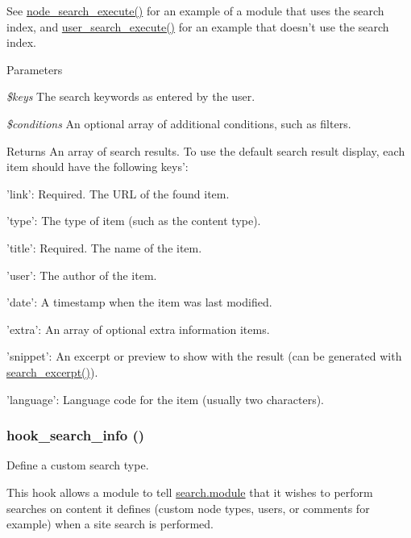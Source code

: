 See \hyperlink{node_8module_ad7047dcdd1c1934351adb73de080c640}{node\_\-search\_\-execute()} for an example of a module that uses the search index, and \hyperlink{user_8module_a04e2120f38c081b16387b631602cc47f}{user\_\-search\_\-execute()} for an example that doesn't use the search index.


\begin{DoxyParams}{Parameters}
\item[{\em \$keys}]The search keywords as entered by the user. \item[{\em \$conditions}]An optional array of additional conditions, such as filters.\end{DoxyParams}
\begin{DoxyReturn}{Returns}
An array of search results. To use the default search result display, each item should have the following keys':
\begin{DoxyItemize}
\item 'link': Required. The URL of the found item.
\item 'type': The type of item (such as the content type).
\item 'title': Required. The name of the item.
\item 'user': The author of the item.
\item 'date': A timestamp when the item was last modified.
\item 'extra': An array of optional extra information items.
\item 'snippet': An excerpt or preview to show with the result (can be generated with \hyperlink{group__search_gaa77622185b2d7ea771cf590d76ab3ba4}{search\_\-excerpt()}).
\item 'language': Language code for the item (usually two characters). 
\end{DoxyItemize}
\end{DoxyReturn}
\hypertarget{group__search_ga37b761616f2cad4796891008f2b374f3}{
\subsubsection[{hook\_\-search\_\-info}]{\setlength{\rightskip}{0pt plus 5cm}hook\_\-search\_\-info ()}}
\label{group__search_ga37b761616f2cad4796891008f2b374f3}
Define a custom search type.

This hook allows a module to tell \hyperlink{search_8module}{search.module} that it wishes to perform searches on content it defines (custom node types, users, or comments for example) when a site search is performed.

